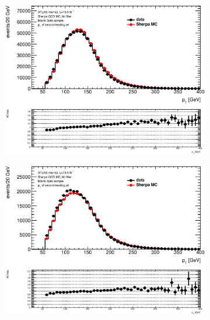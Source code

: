 \begin{figure}[phtb!]
\begin{center}
  \begin{subfigure}[$bbanti$ 3 jet category]{0.3\textwidth}\includegraphics[width=\textwidth]{MonteCarlo/figures/pt1_bbanti_3jets.eps}\end{subfigure}
  \begin{subfigure}[$bbanti$ 4 jet category]{0.3\textwidth}\includegraphics[width=\textwidth]{MonteCarlo/figures/pt1_bbanti_4jets.eps}\end{subfigure}

\end{center}
\end{figure}
